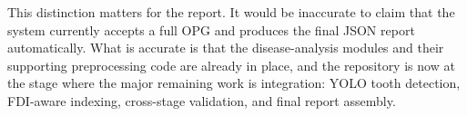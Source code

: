 This distinction matters for the report. It would be inaccurate to claim that
the system currently accepts a full OPG and produces the final JSON report
automatically. What is accurate is that the disease-analysis modules and their
supporting preprocessing code are already in place, and the repository is now
at the stage where the major remaining work is integration: YOLO tooth
detection, FDI-aware indexing, cross-stage validation, and final report assembly.
